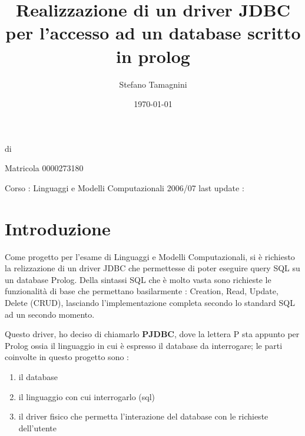 \documentclass[a4paper,titlepage,12pt]{article}	%
\title{Realizzazione di un driver JDBC per l'accesso ad un database scritto in prolog}
\author{Stefano Tamagnini}
\date{\today}
\makeatletter
\def\maketitle{%
  \null
  \thispagestyle{empty}%
  \vfill
  \begin{center}\leavevmode
    \normalfont
    {\huge \raggedright \@title \par}%
    \hrulefill \par
    di {\LARGE \raggedleft \@author \par }%
    {\raggedleft Matricola 0000273180 \par}%
    \vskip 3cm
    Corso : Linguaggi e Modelli Computazionali 2006/07
    \vskip 1cm
    last update : { \@date\par}%
  \end{center}%
  \vfill
  \null
  \cleardoublepage
  }
\makeatother
\begin{document}
\maketitle

\tableofcontents

\newpage

\section{Introduzione}

Come progetto per l'esame di Linguaggi e Modelli Computazionali, si è richiesto la relizzazione di un driver JDBC che permettesse di poter eseguire query SQL su un database Prolog. Della sintassi SQL che è molto vasta sono richieste le funzionalità di base che permettano basilarmente : Creation, Read, Update, Delete (CRUD), lasciando l'implementazione completa secondo lo standard SQL ad un secondo momento.
\par 
Questo driver, ho deciso di chiamarlo {\bf PJDBC}, dove la lettera P sta appunto per Prolog ossia il linguaggio in cui è espresso il database da interrogare; le parti coinvolte in questo progetto sono : 
\begin{enumerate}
\item il database
\item il linguaggio con cui interrogarlo (sql)
\item il driver fisico che permetta l'interazione del database con le richieste dell'utente
\end{enumerate}






	
\end{document}
